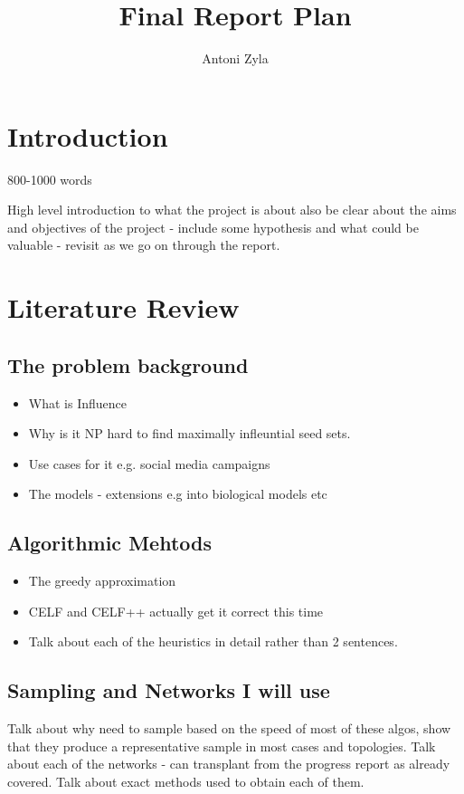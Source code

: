 \documentclass{article}
\title{Final Report Plan}
\author{Antoni Zyla}
\begin{document}
\maketitle

\section{Introduction}
800-1000 words

High level introduction to what the project is about also be clear about the aims and objectives of the project - include some hypothesis and what could be valuable - revisit as we go on through the report.

\section{Literature Review}
\subsection{The problem background}
\begin{itemize}
	\item What is Influence
	\item Why is it NP hard to find maximally infleuntial seed sets.
	\item Use cases for it e.g. social media campaigns
	\item The models - extensions e.g into biological models etc
\end{itemize}
\subsection{Algorithmic Mehtods}
\begin{itemize}
	\item The greedy approximation
	\item CELF and CELF++ actually get it correct this time
	\item Talk about each of the heuristics in detail rather than 2 sentences. 
\end{itemize}
\subsection{Sampling and Networks I will use}
Talk about why need to sample based on the speed of most of these algos, show that they produce a representative sample in most cases and topologies.
Talk about each of the networks - can transplant from the progress report as already covered. Talk about exact methods used to obtain each of them.
\end{document}
